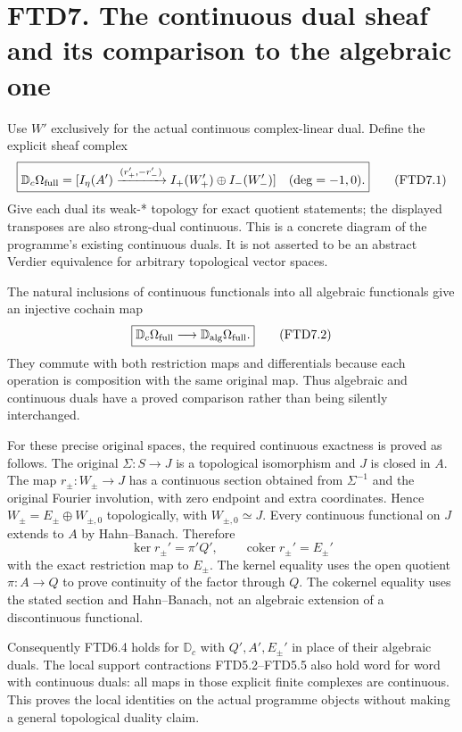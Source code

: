 \section{FTD7. The continuous dual sheaf and its comparison to the
algebraic
one}\label{ftd7.-the-continuous-dual-sheaf-and-its-comparison-to-the-algebraic-one}

Use \(W'\) exclusively for the actual continuous complex-linear dual.
Define the explicit sheaf complex \[
\boxed{
\mathbb D_c\Omega_{\rm full}
=[I_\eta(A')\xrightarrow{(r_+',-r_-')}
I_+(W_+')\oplus I_-(W_-')]
\quad(\deg=-1,0).}
\tag{FTD7.1}
\] Give each dual its weak-* topology for exact quotient statements; the
displayed transposes are also strong-dual continuous. This is a concrete
diagram of the programme's existing continuous duals. It is not asserted
to be an abstract Verdier equivalence for arbitrary topological vector
spaces.

The natural inclusions of continuous functionals into all algebraic
functionals give an injective cochain map \[
\boxed{\mathbb D_c\Omega_{\rm full}
\longrightarrow\mathbb D_{\rm alg}\Omega_{\rm full}.}
\tag{FTD7.2}
\] They commute with both restriction maps and differentials because
each operation is composition with the same original map. Thus algebraic
and continuous duals have a proved comparison rather than being silently
interchanged.

For these precise original spaces, the required continuous exactness is
proved as follows. The original \(\Sigma:S\to J\) is a topological
isomorphism and \(J\) is closed in \(A\). The map \(r_\pm:W_\pm\to J\)
has a continuous section obtained from \(\Sigma^{-1}\) and the original
Fourier involution, with zero endpoint and extra coordinates. Hence
\(W_\pm=E_\pm\oplus W_{\pm,0}\) topologically, with
\(W_{\pm,0}\simeq J\). Every continuous functional on \(J\) extends to
\(A\) by Hahn--Banach. Therefore \[
\ker r_\pm'=\pi'Q',\qquad
\operatorname{coker}r_\pm'=E_\pm'
\tag{FTD7.3}
\] with the exact restriction map to \(E_\pm\). The kernel equality uses
the open quotient \(\pi:A\to Q\) to prove continuity of the factor
through \(Q\). The cokernel equality uses the stated section and
Hahn--Banach, not an algebraic extension of a discontinuous functional.

Consequently FTD6.4 holds for \(\mathbb D_c\) with \(Q',A',E_\pm'\) in
place of their algebraic duals. The local support contractions
FTD5.2--FTD5.5 also hold word for word with continuous duals: all maps
in those explicit finite complexes are continuous. This proves the local
identities on the actual programme objects without making a general
topological duality claim.

